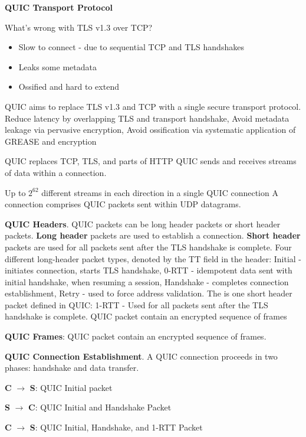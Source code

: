 \documentclass{article}
\begin{document}
\vspace{\baselineskip}
\textbf{QUIC Transport Protocol}

What's wrong with TLS v1.3 over TCP\@?
\begin{itemize}
    \item Slow to connect {-} due to sequential TCP and TLS handshakes
    \item Leaks some metadata
    \item Ossified and hard to extend
\end{itemize}

QUIC aims to replace TLS v1.3 and TCP with a single secure transport protocol.
Reduce latency by overlapping TLS and transport handshake,
Avoid metadata leakage via pervasive encryption,
Avoid ossification via systematic application of GREASE and encryption

QUIC replaces TCP, TLS, and parts of HTTP
QUIC sends and receives streams of data within a connection.

Up to $2^{62}$ different streams in each direction in a single QUIC connection
A connection comprises QUIC packets sent within UDP datagrams.

\textbf{QUIC Headers}. QUIC packets can be long header packets or short header packets.
\textbf{Long header} packets are used to establish a connection.
\textbf{Short header} packets are used for all packets sent after the TLS handshake is complete.
Four different long-header packet types, denoted by the TT field in the header:
Initial {-} initiates connection, starts TLS handshake,
0-RTT {-} idempotent data sent with initial handshake, when resuming a session,
Handshake {-} completes connection establishment,
Retry {-} used to force address validation.
The is one short header packet defined in QUIC\@:
1-RTT {-} Used for all packets sent after the TLS handshake is complete. QUIC packet contain an encrypted sequence of frames

\textbf{QUIC Frames}: QUIC packet contain an encrypted sequence of frames.


\vspace{\baselineskip}
\textbf{QUIC Connection Establishment}. A QUIC connection proceeds in two phases: handshake and data transfer.

\textbf{C} $\rightarrow$ \textbf{S}: QUIC Initial packet

\textbf{S} $\rightarrow$ \textbf{C}: QUIC Initial and Handshake Packet

\textbf{C} $\rightarrow$ \textbf{S}: QUIC Initial, Handshake, and 1-RTT Packet
\end{document}
